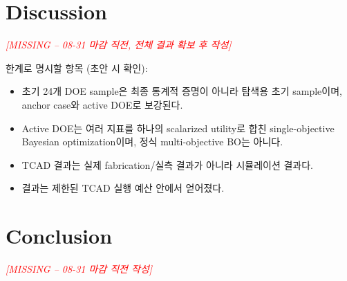 \documentclass[journal]{IEEEtran}
\newcommand{\missing}[1]{\textcolor{red}{\textit{[MISSING -- #1]}}}
\begin{document}
\section{Discussion}
\label{sec:discussion}

\missing{08-31 마감 직전, 전체 결과 확보 후 작성}

한계로 명시할 항목 (초안 시 확인):
\begin{itemize}
  \item 초기 24개 DOE sample은 최종 통계적 증명이 아니라 탐색용 초기 sample이며, anchor case와 active DOE로 보강된다.
  \item Active DOE는 여러 지표를 하나의 scalarized utility로 합친 single-objective Bayesian optimization이며, 정식 multi-objective BO는 아니다.
  \item TCAD 결과는 실제 fabrication/실측 결과가 아니라 시뮬레이션 결과다.
  \item 결과는 제한된 TCAD 실행 예산 안에서 얻어졌다.
\end{itemize}

\section{Conclusion}
\label{sec:conclusion}

\missing{08-31 마감 직전 작성}




\end{document}

